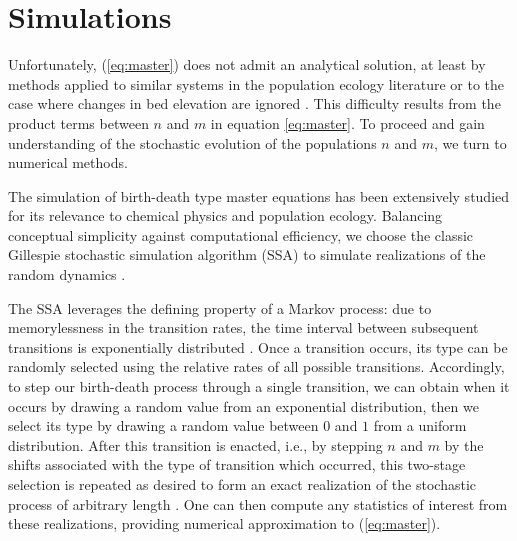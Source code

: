 \documentclass[draft]{agujournal2018}
\begin{document}
\section{Simulations}

Unfortunately, (\ref{eq:master}) does not admit an analytical solution, at least by methods applied to similar systems in the population ecology literature \citep[e.g][]{Swift2002} or to the case where changes in bed elevation are ignored \citep{Ancey2008}.
This difficulty results from the product terms between $n$ and $m$ in equation \ref{eq:master}.
To proceed and gain understanding of the stochastic evolution of the populations $n$ and $m$, we turn to numerical methods.

The simulation of birth-death type master equations has been extensively studied for its relevance to chemical physics and population ecology. 
Balancing conceptual simplicity against computational efficiency, we choose the classic Gillespie stochastic simulation algorithm (SSA) to simulate realizations of the random dynamics  \citep{Gillespie1977, Gillespie1992, Gillespie2007}.

The SSA leverages the defining property of a Markov process: due to memorylessness in the transition rates, the time interval between subsequent transitions is exponentially distributed \citep[e.g.][]{Cox1965}.
Once a transition occurs, its type can be randomly selected using the relative rates of all possible transitions.
Accordingly, to step our birth-death process through a single transition, we can obtain when it occurs by drawing a random value from an exponential distribution, then we select its type by drawing a random value between $0$ and $1$ from a uniform distribution.
After this transition is enacted, i.e., by stepping $n$ and $m$ by the shifts associated with the type of transition which occurred, this two-stage selection is repeated as desired to form an exact realization of the stochastic process of arbitrary length \citep{Gillespie1977, Gillespie1992, Gillespie2007}.
One can then compute any statistics of interest from these realizations, providing numerical approximation to (\ref{eq:master}).
\end{document}
